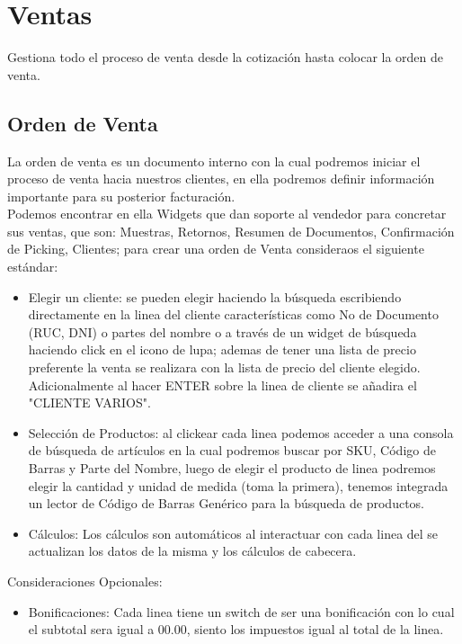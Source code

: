 \documentclass[pdftex,12pt,oneside,a4paper,spanish, english, brazil]{abntex2}
\begin{document}
\begin{sloppypar}
              \section{Ventas}
              Gestiona todo el proceso de venta desde la cotización hasta colocar la orden de venta.
              \subsection{Orden de Venta}
             La orden de venta es un documento interno con la cual podremos iniciar el proceso de venta hacia nuestros clientes, en ella podremos definir información importante para su posterior facturación.\\
             Podemos encontrar en ella Widgets que dan soporte al vendedor para concretar sus ventas, que son: Muestras, Retornos, Resumen de Documentos, Confirmación de Picking, Clientes; para crear una orden de Venta consideraos el siguiente estándar:
             \begin{itemize}
              \item Elegir un cliente: se pueden elegir haciendo la búsqueda escribiendo directamente en la linea del cliente características como No de Documento (RUC, DNI) o partes del nombre o a través de un widget de búsqueda haciendo click en el icono de lupa; ademas de tener una lista de precio preferente la venta se realizara con la lista de precio del cliente elegido.\\
             Adicionalmente al hacer ENTER sobre la linea de cliente
             se añadira el "CLIENTE VARIOS".
             \item Selección de Productos: al clickear cada linea podemos acceder a una consola de búsqueda de artículos en la cual podremos buscar por SKU, Código de Barras y Parte del Nombre, luego de elegir el producto de linea podremos elegir la cantidad y unidad de medida (toma la primera), tenemos integrada un lector de Código de Barras Genérico para la búsqueda de productos.
             \item Cálculos: Los cálculos son automáticos al interactuar con cada linea del se actualizan los datos de la misma y los cálculos de cabecera. 
         	\end{itemize}
         	Consideraciones Opcionales:
         	\begin{itemize}	
         	\item Bonificaciones: Cada linea tiene un switch de ser una bonificación con lo cual el subtotal sera igual a 00.00, siento los impuestos igual al total de la linea.

\end{itemize}
\end{sloppypar}
\end{document}
